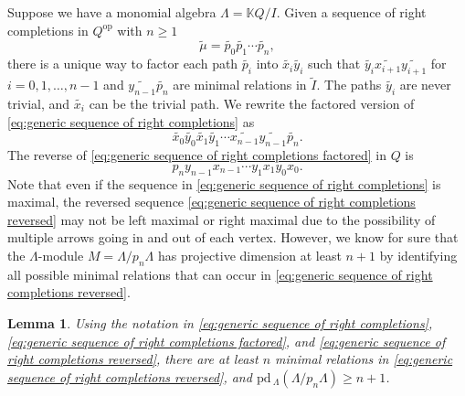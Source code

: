 \documentclass{conm-p-l}
\newcommand{\pd}{\mathrm{pd}\,}
\newcommand{\op}{\mathrm{op}}
\renewcommand{\k}{\mathbb{K}}
\newtheorem{lemma}[theorem]{Lemma}
\theoremstyle{definition}
\theoremstyle{remark}
\numberwithin{equation}{section}
\begin{document}
Suppose we have a monomial algebra $\Lambda=\k Q/I$. Given a sequence of right completions in $Q^{\op}$ with $n\geq 1$
\begin{equation}
\label{eq:generic sequence of right completions}
\tilde{\mu}=\widetilde{p_0}\widetilde{p_1}\cdots \widetilde{p_n},
\end{equation}
there is a unique way to factor each path $\widetilde{p_i}$ into $\widetilde{x_i}\widetilde{y_i}$ such that $\widetilde{y_i}\widetilde{x_{i+1}}\widetilde{y_{i+1}}$ for $i=0,1,\dots,n-1$ and $\widetilde{y_{n-1}}\widetilde{p_n}$ are minimal relations in $\tilde{I}$. The paths $\widetilde{y_i}$ are never trivial, and $\widetilde{x_i}$ can be the trivial path. We rewrite the factored version of \eqref{eq:generic sequence of right completions} as
\begin{equation}
\label{eq:generic sequence of right completions factored}
\widetilde{x_0}\widetilde{y_0}\widetilde{x_1}\widetilde{y_1}\cdots \widetilde{x_{n-1}}\widetilde{y_{n-1}} \widetilde{p_n}.
\end{equation}
The reverse of \eqref{eq:generic sequence of right completions factored} in $Q$ is
\begin{equation}
\label{eq:generic sequence of right completions reversed}
p_n y_{n-1}x_{n-1}\cdots y_1x_1y_0x_0.
\end{equation}
Note that even if the sequence in \eqref{eq:generic sequence of right completions} is maximal, the reversed sequence \eqref{eq:generic sequence of right completions reversed} may not be left maximal or right maximal due to the possibility of multiple arrows going in and out of each vertex. However, we know for sure that the $\Lambda$-module $M=\Lambda/p_n\Lambda$ has projective dimension at least $n+1$ by identifying all possible minimal relations that can occur in \eqref{eq:generic sequence of right completions reversed}.

\begin{lemma}
\label{lem:existence of module with pd equal dell}
Using the notation in \eqref{eq:generic sequence of right completions}, \eqref{eq:generic sequence of right completions factored}, and \eqref{eq:generic sequence of right completions reversed}, there are at least $n$ minimal relations in \eqref{eq:generic sequence of right completions reversed}, and $\pd\!_{\Lambda} (\Lambda/p_n\Lambda) \geq n+1$.
\end{lemma}
\end{document}

